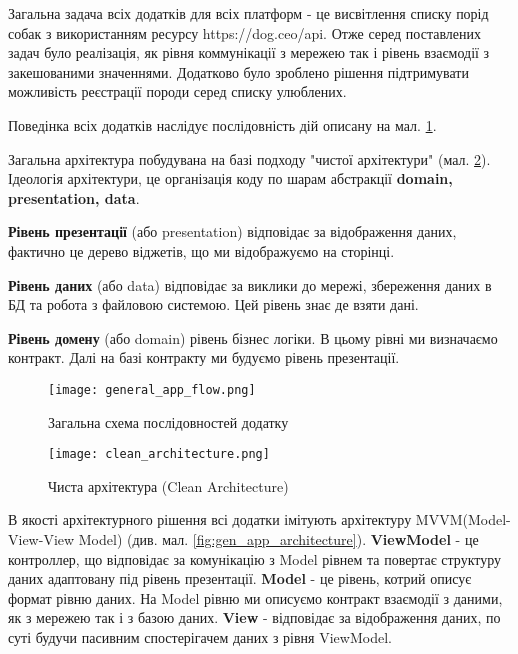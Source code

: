 Загальна задача всіх додатків для всіх платформ - це висвітлення списку порід собак з використанням ресурсу https://dog.ceo/api.
Отже серед поставлених задач було реалізація, як рівня коммунікації з мережею так і рівень взаємодії з закешованими
значеннями. Додатково було зроблено рішення підтримувати можливість реєстрації породи серед списку улюблених.

Поведінка всіх додатків наслідує послідовність дій описану на мал. \ref{fig:gen_app_flow}.

Загальна архітектура побудувана на базі подходу "чистої архітектури" (мал. \ref{fig:clean_architecture}).
Ідеологія архітектури, це організація коду по шарам абстракції \textbf{domain, presentation, data}.

\textbf{Рівень презентації} (або presentation) відповідає за відображення даних, фактично це дерево віджетів,
що ми відображуємо на сторінці.

\textbf{Рівень даних} (або data) відповідає за виклики до мережі, збереження даних в БД та робота з файловою системою.
Цей рівень знає де взяти дані.

\textbf{Рівень домену} (або domain) рівень бізнес логіки. В цьому рівні ми визначаємо контракт. Далі на базі контракту
ми будуємо рівень презентації.

\begin{figure}
    \begin{center}
        \texttt{[image: general\_app\_flow.png]}
        \caption{Загальна схема послідовностей додатку}
        \label{fig:gen_app_flow}
    \end{center}
\end{figure}

\begin{figure}
    \begin{center}
        \texttt{[image: clean\_architecture.png]}
        \caption{Чиста архітектура (Clean Architecture)}
        \label{fig:clean_architecture}
    \end{center}
\end{figure}

В якості архітектурного рішення всі додатки імітують архітектуру MVVM(Model-View-View Model) (див. мал. \ref{fig:gen_app_architecture}).
\textbf{ViewModel} - це контроллер, що відповідає за комунікацію з Model рівнем та повертає структуру даних адаптовану під рівень презентації.
\textbf{Model} - це рівень, котрий описує формат рівню даних. На Model рівню ми описуємо контракт взаємодії з даними, як з
мережею так і з базою даних.
\textbf{View} - відповідає за відображення даних, по суті будучи пасивним спостерігачем даних з рівня ViewModel.

